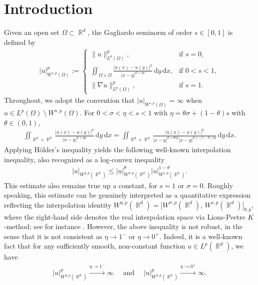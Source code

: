 \documentclass[12pt, reqno]{amsart}%
\theoremstyle{plain}  %
\theoremstyle{definition}  %
\theoremstyle{remark}
\numberwithin{equation}{section}
\DeclareMathOperator{\R}{\mathbb{R}}
\renewcommand{\d}{\,\mathrm{d}}
\begin{document}


\tableofcontents

\section{Introduction}\label{sec:introduction}
Given an open set $\Omega\subset\R^d$, the Gagliardo seminorm of order $s\in [0,1]$ is defined
by
\begin{align*}
|u|^p_{W^{s,p}(\Omega)} :=
\begin{cases}
\|u\|_{L^p(\Omega)}^p, & \text{if } s = 0, \\
\displaystyle  \iint_{\Omega\times\Omega}
\frac{|u(x) - u(y)|^p}{|x - y|^{d + sp}}\d y\d x, & \text{if } 0 < s < 1, \\
\|\nabla u\|_{L^p(\Omega)}^p, & \text{if } s = 1.
\end{cases}
\end{align*}
Throughout, we adopt the convention that $|u|_{W^{s,p}(\Omega)}=\infty$ when $u\in L^p(\Omega)~\setminus~W^{s,p}(\Omega)$. For $0<\sigma<\eta<s< 1$ with $\eta=\theta \sigma+ (1-\theta)s$ with $\theta\in (0,1)$,
\begin{align*}
\iint_{\R^d \times \R^d}
\frac{|u(x) - u(y)|^p}{|x - y|^{d + \eta p}}\d y\d x=  \iint_{\R^d \times \R^d}
\frac{|u(x) - u(y)|^p}{|x - y|^{d + \theta \sigma p}|x - y|^{d + (1-\theta)sp}}\d y\d x.
\end{align*}
Applying Hölder's inequality yields the following well-known interpolation inequality, also recognized as a log-convex inequality
\begin{align*}
|u|_{W^{\eta, p}(\R^d)}\leq |u|^{\theta}_{W^{\sigma, p}(\R^d)} |u|^{1-\theta}_{W^{s, p}(\R^d)}.
\end{align*}
This estimate also remains true up a constant, for $s=1$ or $\sigma=0$. Roughly speaking, this estimate can be genuinely interpreted as a quantitative expression reflecting  the interpolation identity $W^{\eta, p}(\R^d) = \big[ W^{\sigma, p}(\R^d),\, W^{s, p}(\R^d) \big]_{\theta, p},$
where the right-hand side denotes the real interpolation space via Lions-Peetre $ K$-method; see for instance \cite{BeLo76,Trie95-interpolation,Lun18}. However, the above inequality is not robust, in the sense that it is not consistent as $\eta \to 1^-$ or $\eta \to 0^+$. Indeed, it is a well-known fact that for any sufficiently smooth, non-constant function $u \in L^p(\R^d)$, we have
\begin{align*}
|u|^p_{W^{\eta, p}(\R^d)} \xrightarrow{\eta\to 1^-}\infty\quad \text{ and }\quad |u|^p_{W^{\eta, p}(\R^d)} \xrightarrow{\eta\to 0^+}\infty.
\end{align*}
\end{document}
